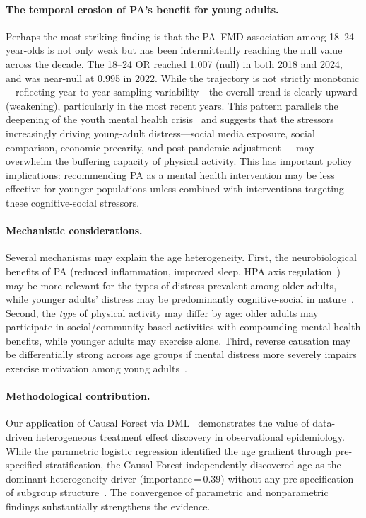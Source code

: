 \documentclass[11pt]{article}
\begin{document}
\paragraph{The temporal erosion of PA's benefit for young adults.}
Perhaps the most striking finding is that the PA--FMD association among 18--24-year-olds is not only weak but has been intermittently reaching the null value across the decade.
The 18--24 OR reached 1.007 (null) in both 2018 and 2024, and was near-null at 0.995 in 2022.
While the trajectory is not strictly monotonic---reflecting year-to-year sampling variability---the overall trend is clearly upward (weakening), particularly in the most recent years.
This pattern parallels the deepening of the youth mental health crisis~\citep{twenge2019age,twenge2023increases,goodwin2022trends} and suggests that the stressors increasingly driving young-adult distress---social media exposure, social comparison, economic precarity, and post-pandemic adjustment~\citep{haidt2023adolescent}---may overwhelm the buffering capacity of physical activity.
This has important policy implications: recommending PA as a mental health intervention may be less effective for younger populations unless combined with interventions targeting these cognitive-social stressors.

\paragraph{Mechanistic considerations.}
Several mechanisms may explain the age heterogeneity.
First, the neurobiological benefits of PA (reduced inflammation, improved sleep, HPA axis regulation~\citep{dishman2006neurobiology}) may be more relevant for the types of distress prevalent among older adults, while younger adults' distress may be predominantly cognitive-social in nature~\citep{lubans2016physical,arnett2000emerging}.
Second, the \emph{type} of physical activity may differ by age: older adults may participate in social/community-based activities with compounding mental health benefits, while younger adults may exercise alone.
Third, reverse causation may be differentially strong across age groups if mental distress more severely impairs exercise motivation among young adults~\citep{kandola2019depressive}.

\paragraph{Methodological contribution.}
Our application of Causal Forest via DML~\citep{chernozhukov2018double,wager2018estimation} demonstrates the value of data-driven heterogeneous treatment effect discovery in observational epidemiology.
While the parametric logistic regression identified the age gradient through pre-specified stratification, the Causal Forest independently discovered age as the dominant heterogeneity driver (importance\,=\,0.39) without any pre-specification of subgroup structure~\citep{sverdrup2025estimating}.
The convergence of parametric and nonparametric findings substantially strengthens the evidence.
\end{document}
